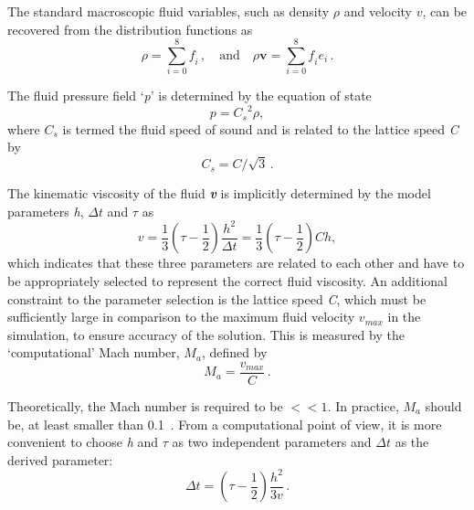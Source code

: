 The standard macroscopic fluid variables, such as density 
$\rho$ and velocity 
$\mathbf{\mathit{ v}}$, can be recovered from the distribution functions as
%
\begin{equation}
	\rho = \sum\limits_{\mathit{i}=0}^{8}{\mathit{f_i}}\,, \quad \mbox{and} 
	\quad \rho \mathbf{v} 
	= \sum\limits_{\mathit{i}=0}^{8}{\mathit{f_i}}\mathbf{\mathit{e_i}}\,.
\end{equation}

The fluid pressure field `\textit{p}' is determined by the 
equation of state
%
\begin{equation}
	\mathit{p}=\mathit{C_s}^{2} \rho,
\end{equation}
%
\noindent where $\mathit{C_s}$ is termed the fluid speed of 
sound and is related to the lattice speed \textit{C} by
%
\begin{equation}
	\mathit{C_s}=\mathit{C}/\sqrt{3}\,.
\end{equation}

The kinematic viscosity of the fluid \textbf{\textit{v}} is 
implicitly determined by the model parameters \textit{h}, 
$\Delta \mathit{t}$ and $\tau$ 
as
%
\begin{equation}
	\mathit{v}=\frac{1}{3}(\tau - \frac{1}{2})\frac{\mathit{h}^{2}}{\Delta 
	\mathit{t}} = \frac{1}{3}(\tau - \frac{1}{2})\mathit{Ch},
\end{equation}
%
\noindent which indicates that these three parameters are 
related to each other and have to be appropriately selected to 
represent the correct fluid viscosity. An additional constraint 
to the parameter selection is the lattice speed \textit{C}, 
which must be sufficiently large in comparison to the maximum 
fluid velocity $\mathit{v}_{\mathit{max}}$ in the simulation, 
to ensure accuracy of the solution. This is measured by the 
`computational' Mach number, $\mathit{M}_{\mathit{a}}$, defined 
by
%
\begin{equation}
	\mathit{M}_{\mathit{a}}=\frac{\mathit{v}_{\mathit{max}}}{\mathit{C}}\,.
\end{equation}

Theoretically, the Mach number is required to be $<< 1$. In 
practice, $\mathit{M}_{\mathit{a}}$ should be, at least smaller 
than 0.1~\citep{He1997}. From a computational point of view, it 
is more convenient to choose \textit{h} and $\tau$ as two 
independent parameters and $\Delta \mathit{t}$ as the derived 
parameter:
%
\begin{equation}
	\Delta \mathit{t} = (\tau - \frac{1}{2}) \frac{h^{2}}{3\mathit{v}}\,.
\end{equation}

